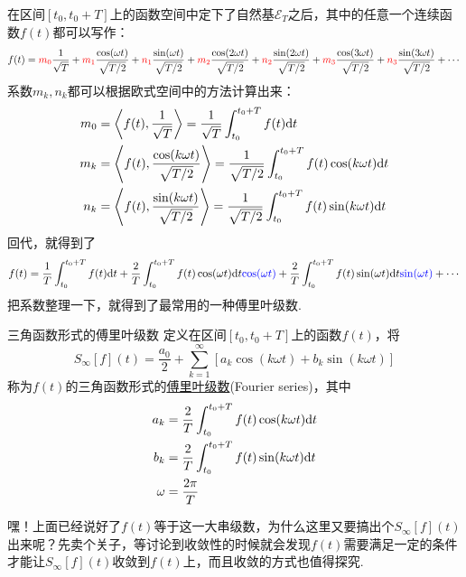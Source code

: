 \documentclass[main.tex]{subfiles}
\begin{document}
在区间\([t_0,t_0+T]\)上的函数空间中定下了自然基\(\mathcal{E}_{T}\)之后，其中的任意一个连续函数\(f(t)\)都可以写作：
\[ f(t) = {\color{red}m_0}\frac{1}{\sqrt{T}} + {\color{red}m_1}\frac{\cos(\omega t)}{\sqrt{T/2}} + {\color{red}n_1}\frac{\sin(\omega t)}{\sqrt{T/2}} + {\color{red}m_2}\frac{\cos(2\omega t)}{\sqrt{T/2}} + {\color{red}n_2}\frac{\sin(2\omega t)}{\sqrt{T/2}} + {\color{red}m_3}\frac{\cos(3\omega t)}{\sqrt{T/2}} + {\color{red}n_3}\frac{\sin(3\omega t)}{\sqrt{T/2}} + \cdots\]
系数\(m_k,n_k\)都可以根据欧式空间中的方法计算出来：
\begin{align*}
    m_0 &= \left\langle f(t), \frac{1}{\sqrt{T}} \right\rangle = \frac{1}{\sqrt{T}}\int_{t_0}^{t_0+T} f(t){\rm d}t \\
    m_k &= \left\langle f(t), \frac{\cos(k\omega t)}{\sqrt{T/2}} \right\rangle = \frac{1}{\sqrt{T/2}}\int_{t_0}^{t_0+T} f(t)\cos(k\omega t){\rm d}t \\
    n_k &= \left\langle f(t), \frac{\sin(k\omega t)}{\sqrt{T/2}} \right\rangle = \frac{1}{\sqrt{T/2}}\int_{t_0}^{t_0+T} f(t)\sin(k\omega t){\rm d}t
\end{align*}
回代，就得到了
\[ f(t) = \frac{1}{T} \int_{t_0}^{t_0+T} f(t){\rm d}t + \frac{2}{T}\int_{t_0}^{t_0+T} f(t)\cos(\omega t){\rm d}t{\color{blue}\cos(\omega t)} + \frac{2}{T}\int_{t_0}^{t_0+T} f(t)\sin(\omega t){\rm d}t{\color{blue}\sin(\omega t)}+\cdots\]
把系数整理一下，就得到了最常用的一种傅里叶级数.
\begin{definition}{三角函数形式的傅里叶级数}
    定义在区间\([t_0,t_0+T]\)上的函数\(f(t)\)，将
    \[S_{\infty}[f](t) = \frac{a_0}{2}+\sum_{k=1}^{\infty} \left[a_k\cos(k\omega t)+b_k\sin(k\omega t)\right]\]
    称为\(f(t)\)的三角函数形式的\uline{傅里叶级数}(Fourier series)，其中
    \begin{align*}
        a_k &= \frac{2}{T}\int_{t_0}^{t_0+T} f(t)\cos(k\omega t){\rm d}t \\
        b_k &= \frac{2}{T}\int_{t_0}^{t_0+T} f(t)\sin(k\omega t){\rm d}t \\
        \omega &= \frac{2\pi}{T}
    \end{align*}
\end{definition}

嘿！上面已经说好了\(f(t)\)等于这一大串级数，为什么这里又要搞出个\(S_{\infty}[f](t)\)出来呢？先卖个关子，等讨论到收敛性的时候就会发现\(f(t)\)需要满足一定的条件才能让\(S_{\infty}[f](t)\)收敛到\(f(t)\)上，而且收敛的方式也值得探究.

\vspace{1cm}
\end{document}
